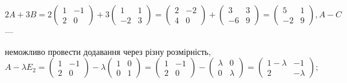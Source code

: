 \documentclass[12pt,a4paper]{article}
\begin{document}
    \(
    2A + 3B = 
    2\begin{pmatrix}
    1 & -1\\
    2 & 0 
    \end{pmatrix} + 
    3\begin{pmatrix}
    1 & 1\\
    -2 & 3 
    \end{pmatrix} = 
    \begin{pmatrix}
    2 & -2\\
    4 & 0 
    \end{pmatrix} + 
    \begin{pmatrix}
    3 & 3\\
    -6 & 9
    \end{pmatrix} = 
    \begin{pmatrix}
    5 & 1\\
    -2 & 9 
    \end{pmatrix},
    A - C
    \) ---
    
    неможливо провести додавання через різну розмірність,
    \(A - \lambda E_2 = 
    \begin{pmatrix}
    1 & -1\\
    2 & 0 
    \end{pmatrix} - 
    \lambda\begin{pmatrix}
    1 & 0\\
    0 & 1 
    \end{pmatrix} = 
    \begin{pmatrix}
    1 & -1\\
    2 & 0 
    \end{pmatrix} - 
    \begin{pmatrix}
    \lambda & 0\\
    0 & \lambda 
    \end{pmatrix} = 
    \begin{pmatrix}
    1-\lambda & -1\\
    2 & -\lambda 
    \end{pmatrix};
    \)
\end{document}
